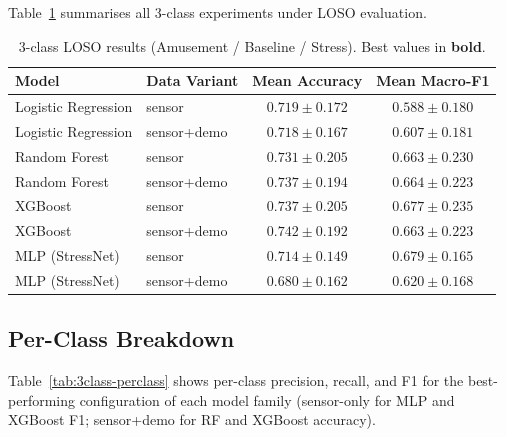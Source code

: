 \documentclass[11pt]{article}
\begin{document}
Table~\ref{tab:3class} summarises all 3-class experiments under LOSO evaluation.

\begin{table}[H]
\centering
\caption{3-class LOSO results (Amusement / Baseline / Stress). Best values in \textbf{bold}.}
\label{tab:3class}
\begin{tabular}{llcc}
\toprule
\textbf{Model} & \textbf{Data Variant} & \textbf{Mean Accuracy} & \textbf{Mean Macro-F1} \\
\midrule
Logistic Regression & sensor        & $0.719 \pm 0.172$ & $0.588 \pm 0.180$ \\
Logistic Regression & sensor+demo   & $0.718 \pm 0.167$ & $0.607 \pm 0.181$ \\
\midrule
Random Forest       & sensor        & $0.731 \pm 0.205$ & $0.663 \pm 0.230$ \\
Random Forest       & sensor+demo   & $0.737 \pm 0.194$ & $0.664 \pm 0.223$ \\
\midrule
XGBoost             & sensor        & $0.737 \pm 0.205$ & $\mathbf{0.677 \pm 0.235}$ \\
XGBoost             & sensor+demo   & $\mathbf{0.742 \pm 0.192}$ & $0.663 \pm 0.223$ \\
\midrule
MLP (StressNet)     & sensor        & $0.714 \pm 0.149$ & $0.679 \pm 0.165$ \\
MLP (StressNet)     & sensor+demo   & $0.680 \pm 0.162$ & $0.620 \pm 0.168$ \\
\bottomrule
\end{tabular}
\end{table}

\subsection{Per-Class Breakdown}

Table~\ref{tab:3class-perclass} shows per-class precision, recall, and F1 for the best-performing configuration of each model family (sensor-only for MLP and XGBoost F1; sensor+demo for RF and XGBoost accuracy).
\end{document}
